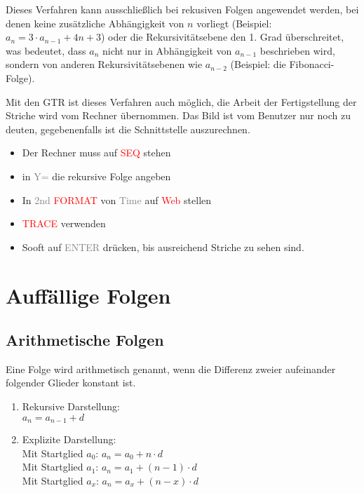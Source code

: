 \documentclass[main.tex]{subfiles}
\begin{document}
\begin{Bemerkung}
Dieses Verfahren kann ausschließlich bei rekusiven Folgen angewendet werden, bei denen keine zusätzliche Abhängigkeit von $n$ vorliegt (Beispiel: $a_{n}=3\cdot a_{n-1}+4n+3$) oder die Rekursivitätsebene den 1. Grad überschreitet, was bedeutet, dass $a_{n}$ nicht nur in Abhängigkeit von $a_{n-1}$ beschrieben wird, sondern von anderen Rekursivitätsebenen wie $a_{n-2}$ (Beispiel: die Fibonacci-Folge).\\
\end{Bemerkung}

\begin{GTR-Tipp}
	Mit den GTR ist dieses Verfahren auch möglich, die Arbeit der Fertigstellung der Striche wird vom Rechner übernommen. Das Bild ist vom Benutzer nur noch zu deuten, gegebenenfalls ist die Schnittstelle auszurechnen.
	\begin{itemize}
		\item Der Rechner muss auf \textcolor{red}{SEQ} stehen
		\item in \textcolor{gray}{Y=} die rekursive Folge angeben
		\item In \textcolor{gray}{2nd }\textcolor{red}{FORMAT} von \textcolor{gray}{Time} auf \textcolor{red}{Web} stellen
		\item \textcolor{red}{TRACE} verwenden
		\item Sooft auf \textcolor{gray}{ENTER} drücken, bis ausreichend Striche zu sehen sind.
	\end{itemize}
\end{GTR-Tipp}


		\section{Auffällige Folgen}


	\subsection{Arithmetische Folgen}

\begin{Definition}
Eine Folge wird arithmetisch genannt, wenn die Differenz zweier aufeinander folgender Glieder konstant ist.
\begin{enumerate}
\item Rekursive Darstellung:\\
\indent $a_{n}=a_{n-1}+d$
\item Explizite Darstellung:\\
\indent Mit Startglied $a_{0}$: $a_{n}=a_{0}+n\cdot d$\\
\indent Mit Startglied $a_{1}$: $a_{n}=a_{1}+(n-1)\cdot d$\\
\indent Mit Startglied $a_{x}$: $a_{n}=a_{x}+(n-x)\cdot d$
\end{enumerate}
\end{Definition}
\end{document}
